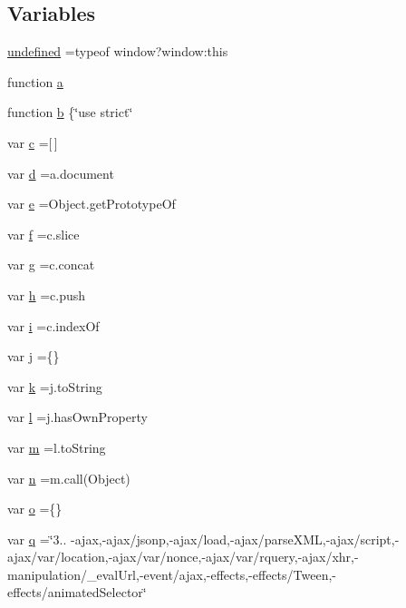 \subsection*{Variables}
\begin{DoxyCompactItemize}
\item 
\hyperlink{jquery-3_8js_ae21cc36bf0d65014c717a481a3f8a468}{undefined} =typeof window?window\+:this
\item 
function \hyperlink{jquery-3_8js_aa4d4888597588a84fd5b1184d00c91f3}{a}
\item 
function \hyperlink{jquery-3_8js_ac0431efac4d7c393d1e70b86115cb93f}{b} \{\char`\"{}use strict\char`\"{}
\item 
var \hyperlink{jquery-3_8js_abce695e0af988ece0826d9ad59b8160d}{c} =\mbox{[}$\,$\mbox{]}
\item 
var \hyperlink{jquery-3_8js_aeb337d295abaddb5ec3cb34cc2e2bbc9}{d} =a.\+document
\item 
var \hyperlink{jquery-3_8js_ab5902775854a8b8440bcd25e0fe1c120}{e} =Object.\+get\+Prototype\+Of
\item 
var \hyperlink{jquery-3_8js_a9cf09a2972472098a4c689fd988f4dfc}{f} =c.\+slice
\item 
var \hyperlink{jquery-3_8js_a103df269476e78897c9c4c6cb8f4eb06}{g} =c.\+concat
\item 
var \hyperlink{jquery-3_8js_a79fe0eb780a2a4b5543b4dddf8b6188a}{h} =c.\+push
\item 
var \hyperlink{jquery-3_8js_a5e25b1d1bed9ab5f3174b76d6a722180}{i} =c.\+index\+Of
\item 
var \hyperlink{jquery-3_8js_aab858032a95af802114b255fac6f45f2}{j} =\{\}
\item 
var \hyperlink{jquery-3_8js_ab26645c014aa005ecedef329ecf58c99}{k} =j.\+to\+String
\item 
var \hyperlink{jquery-3_8js_ae5e71a2600e8891c54854be157cc6626}{l} =j.\+has\+Own\+Property
\item 
var \hyperlink{jquery-3_8js_a9e77e016b2928d7dcb493b89a0c9dc32}{m} =l.\+to\+String
\item 
var \hyperlink{jquery-3_8js_a3c7365c007156a2a63223e3c9909fbf8}{n} =m.\+call(Object)
\item 
var \hyperlink{jquery-3_8js_a400dc8109620963da8314d4bdfa14f83}{o} =\{\}
\item 
var \hyperlink{jquery-3_8js_aee3046c01d22ccd1efcb944608aec125}{q} =\char`\"{}3.. -\/ajax,-\/ajax/jsonp,-\/ajax/load,-\/ajax/parse\+X\+ML,-\/ajax/script,-\/ajax/var/location,-\/ajax/var/nonce,-\/ajax/var/rquery,-\/ajax/xhr,-\/manipulation/\+\_\+eval\+Url,-\/event/ajax,-\/effects,-\/effects/Tween,-\/effects/animated\+Selector\char`\"{}

\end{DoxyCompactItemize}
